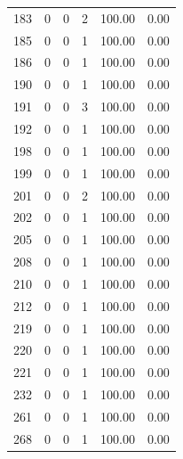 \documentclass[11pt]{article}
\begin{document}
\begin{longtable}{r|r|r|r|r|r}
    183   & 0     & 0     & 2     & 100.00 & 0.00 \\
    185   & 0     & 0     & 1     & 100.00 & 0.00 \\
    186   & 0     & 0     & 1     & 100.00 & 0.00 \\
    190   & 0     & 0     & 1     & 100.00 & 0.00 \\
    191   & 0     & 0     & 3     & 100.00 & 0.00 \\
    192   & 0     & 0     & 1     & 100.00 & 0.00 \\
    198   & 0     & 0     & 1     & 100.00 & 0.00 \\
    199   & 0     & 0     & 1     & 100.00 & 0.00 \\
    201   & 0     & 0     & 2     & 100.00 & 0.00 \\
    202   & 0     & 0     & 1     & 100.00 & 0.00 \\
    205   & 0     & 0     & 1     & 100.00 & 0.00 \\
    208   & 0     & 0     & 1     & 100.00 & 0.00 \\
    210   & 0     & 0     & 1     & 100.00 & 0.00 \\
    212   & 0     & 0     & 1     & 100.00 & 0.00 \\
    219   & 0     & 0     & 1     & 100.00 & 0.00 \\
    220   & 0     & 0     & 1     & 100.00 & 0.00 \\
    221   & 0     & 0     & 1     & 100.00 & 0.00 \\
    232   & 0     & 0     & 1     & 100.00 & 0.00 \\
    261   & 0     & 0     & 1     & 100.00 & 0.00 \\
    268   & 0     & 0     & 1     & 100.00 & 0.00 \\
    \bottomrule
\end{longtable} 
\end{document}
